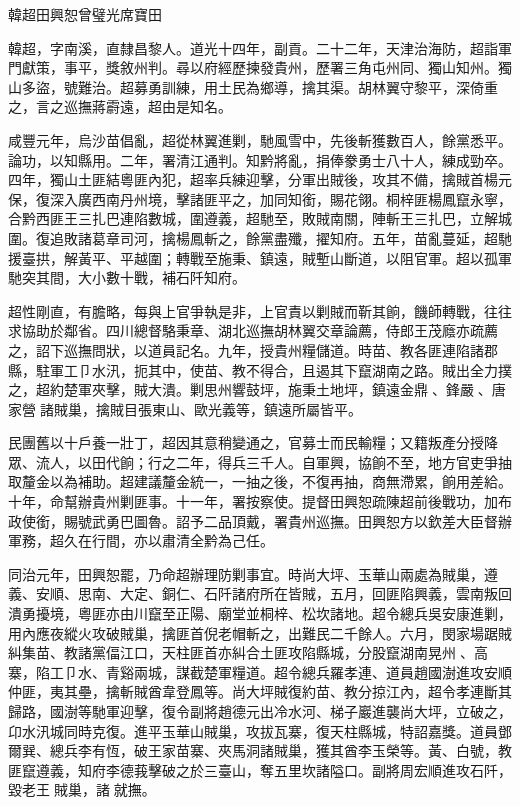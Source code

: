 
\begin{pinyinscope}
韓超田興恕曾璧光席寶田

韓超，字南溪，直隸昌黎人。道光十四年，副貢。二十二年，天津治海防，超詣軍門獻策，事平，獎敘州判。尋以府經歷揀發貴州，歷署三角屯州同、獨山知州。獨山多盜，號難治。超募勇訓練，用土民為鄉導，擒其渠。胡林翼守黎平，深倚重之，言之巡撫蔣霨遠，超由是知名。

咸豐元年，烏沙苗倡亂，超從林翼進剿，馳風雪中，先後斬獲數百人，餘黨悉平。論功，以知縣用。二年，署清江通判。知黔將亂，捐俸豢勇士八十人，練成勁卒。四年，獨山土匪結粵匪內犯，超率兵練迎擊，分軍出賊後，攻其不備，擒賊首楊元保，復深入廣西南丹州境，擊諸匪平之，加同知銜，賜花翎。桐梓匪楊鳳竄永寧，合黔西匪王三扎巴連陷數城，圍遵義，超馳至，敗賊南關，陣斬王三扎巴，立解城圍。復追敗諸葛章司河，擒楊鳳斬之，餘黨盡殲，擢知府。五年，苗亂蔓延，超馳援臺拱，解黃平、平越圍；轉戰至施秉、鎮遠，賊塹山斷道，以阻官軍。超以孤軍馳突其間，大小數十戰，補石阡知府。

超性剛直，有膽略，每與上官爭執是非，上官責以剿賊而靳其餉，饑師轉戰，往往求協助於鄰省。四川總督駱秉章、湖北巡撫胡林翼交章論薦，侍郎王茂廕亦疏薦之，詔下巡撫問狀，以道員記名。九年，授貴州糧儲道。時苗、教各匪連陷諸郡縣，駐軍工⼙水汛，扼其中，使苗、教不得合，且遏其下竄湖南之路。賊出全力撲之，超約楚軍夾擊，賊大潰。剿思州響鼓坪，施秉土地坪，鎮遠金鼎、鋒嚴、唐家營諸賊巢，擒賊目張東山、歐光義等，鎮遠所屬皆平。

民團舊以十戶養一壯丁，超因其意稍變通之，官募士而民輸糧；又籍叛產分授降眾、流人，以田代餉；行之二年，得兵三千人。自軍興，協餉不至，地方官吏爭抽取釐金以為補助。超建議釐金統一，一抽之後，不復再抽，商無滯累，餉用差給。十年，命幫辦貴州剿匪事。十一年，署按察使。提督田興恕疏陳超前後戰功，加布政使銜，賜號武勇巴圖魯。詔予二品頂戴，署貴州巡撫。田興恕方以欽差大臣督辦軍務，超久在行間，亦以肅清全黔為己任。

同治元年，田興恕罷，乃命超辦理防剿事宜。時尚大坪、玉華山兩處為賊巢，遵義、安順、思南、大定、銅仁、石阡諸府所在皆賊，五月，回匪陷興義，雲南叛回潰勇擾境，粵匪亦由川竄至正陽、廟堂並桐梓、松坎諸地。超令總兵吳安康進剿，用內應夜縱火攻破賊巢，擒匪首倪老帽斬之，出難民二千餘人。六月，閔家場踞賊糾集苗、教諸黨偪江口，天柱匪首亦糾合土匪攻陷縣城，分股竄湖南晃州、高寨，陷工⼙水、青谿兩城，謀截楚軍糧道。超令總兵羅孝連、道員趙國澍進攻安順仲匪，夷其壘，擒斬賊酋韋登鳳等。尚大坪賊復約苗、教分掠江內，超令孝連斷其歸路，國澍等馳軍迎擊，復令副將趙德元出冷水河、梯子巖進襲尚大坪，立破之，卬水汛城同時克復。進平玉華山賊巢，攻拔瓦寨，復天柱縣城，特詔嘉獎。道員鄧爾巽、總兵李有恆，破王家苗寨、夾馬洞諸賊巢，獲其酋李玉榮等。黃、白號，教匪竄遵義，知府李德莪擊破之於三臺山，奪五里坎諸隘口。副將周宏順進攻石阡，毀老王賊巢，諸就撫。


\end{pinyinscope}
